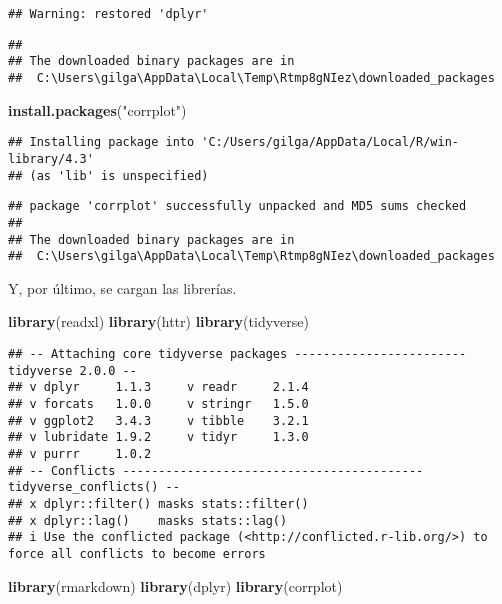\documentclass[
]{article}
\newenvironment{Shaded}{\begin{snugshade}}{\end{snugshade}}
\newcommand{\FunctionTok}[1]{\textcolor[rgb]{0.13,0.29,0.53}{\textbf{#1}}}
\newcommand{\NormalTok}[1]{#1}
\newcommand{\StringTok}[1]{\textcolor[rgb]{0.31,0.60,0.02}{#1}}
\begin{document}
\begin{verbatim}
## Warning: restored 'dplyr'
\end{verbatim}

\begin{verbatim}
## 
## The downloaded binary packages are in
##  C:\Users\gilga\AppData\Local\Temp\Rtmp8gNIez\downloaded_packages
\end{verbatim}

\begin{Shaded}
\begin{Highlighting}[]
\FunctionTok{install.packages}\NormalTok{(}\StringTok{"corrplot"}\NormalTok{)}
\end{Highlighting}
\end{Shaded}

\begin{verbatim}
## Installing package into 'C:/Users/gilga/AppData/Local/R/win-library/4.3'
## (as 'lib' is unspecified)
\end{verbatim}

\begin{verbatim}
## package 'corrplot' successfully unpacked and MD5 sums checked
## 
## The downloaded binary packages are in
##  C:\Users\gilga\AppData\Local\Temp\Rtmp8gNIez\downloaded_packages
\end{verbatim}

Y, por último, se cargan las librerías.

\begin{Shaded}
\begin{Highlighting}[]
\FunctionTok{library}\NormalTok{(readxl)}
\FunctionTok{library}\NormalTok{(httr)}
\FunctionTok{library}\NormalTok{(tidyverse)}
\end{Highlighting}
\end{Shaded}

\begin{verbatim}
## -- Attaching core tidyverse packages ------------------------ tidyverse 2.0.0 --
## v dplyr     1.1.3     v readr     2.1.4
## v forcats   1.0.0     v stringr   1.5.0
## v ggplot2   3.4.3     v tibble    3.2.1
## v lubridate 1.9.2     v tidyr     1.3.0
## v purrr     1.0.2     
## -- Conflicts ------------------------------------------ tidyverse_conflicts() --
## x dplyr::filter() masks stats::filter()
## x dplyr::lag()    masks stats::lag()
## i Use the conflicted package (<http://conflicted.r-lib.org/>) to force all conflicts to become errors
\end{verbatim}

\begin{Shaded}
\begin{Highlighting}[]
\FunctionTok{library}\NormalTok{(rmarkdown)}
\FunctionTok{library}\NormalTok{(dplyr)}
\FunctionTok{library}\NormalTok{(corrplot)}
\end{Highlighting}
\end{Shaded}
\end{document}
